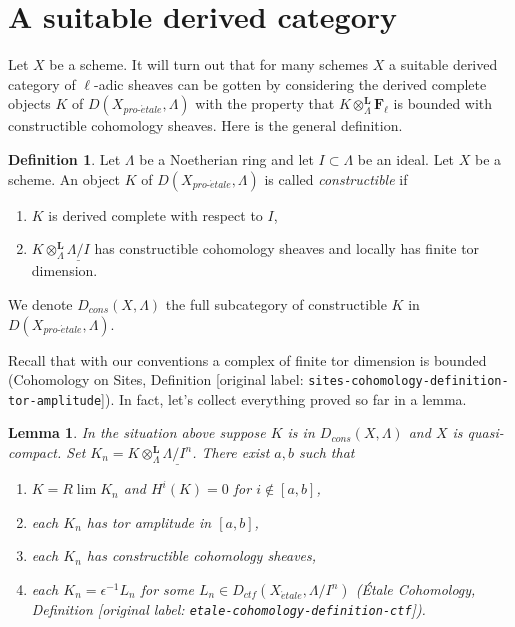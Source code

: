 \documentclass[10pt,a4paper]{article}
\theoremstyle{plain}
\newtheorem{lemma}[subsection]{Lemma}
\theoremstyle{definition}
\newtheorem{definition}[subsection]{Definition}
\theoremstyle{remark}
\numberwithin{equation}{subsection}
\def\lim{\mathop{\mathrm{lim}}\nolimits}
\def\proetale{{pro\text{-}\acute{e}tale}}
\def\etale{{\acute{e}tale}}
\begin{document}
\section{A suitable derived category}
\label{section-suitable-derived}

\noindent
Let $X$ be a scheme. It will turn out that for many schemes $X$ a suitable
derived category of $\ell$-adic sheaves can be gotten by considering the
derived complete objects $K$ of $D(X_\proetale, \Lambda)$ with the property
that $K \otimes_\Lambda^\mathbf{L} \mathbf{F}_\ell$ is bounded with
constructible cohomology sheaves. Here is the general definition.

\begin{definition}
\label{definition-Dbc}
Let $\Lambda$ be a Noetherian ring and let $I \subset \Lambda$ be an ideal.
Let $X$ be a scheme. An object $K$ of $D(X_\proetale, \Lambda)$ is called
{\it constructible} if
\begin{enumerate}
\item $K$ is derived complete with respect to $I$,
\item $K \otimes_\Lambda^\mathbf{L} \underline{\Lambda/I}$
has constructible cohomology sheaves and locally has finite tor dimension.
\end{enumerate}
We denote $D_{cons}(X, \Lambda)$ the full subcategory of constructible
$K$ in $D(X_\proetale, \Lambda)$.
\end{definition}

\noindent
Recall that with our conventions a complex of finite tor dimension
is bounded (Cohomology on Sites, Definition
\textnormal{[original label: \nolinkurl{sites-cohomology-definition-tor-amplitude}]}).
In fact, let's collect everything proved so far in a lemma.

\begin{lemma}
\label{lemma-describe-constructible-complexes}
In the situation above suppose $K$ is in $D_{cons}(X, \Lambda)$
and $X$ is quasi-compact. Set
$K_n = K \otimes_\Lambda^\mathbf{L} \underline{\Lambda/I^n}$.
There exist $a, b$ such that
\begin{enumerate}
\item $K = R\lim K_n$ and $H^i(K) = 0$ for $i \not \in [a, b]$,
\item each $K_n$ has tor amplitude in $[a, b]$,
\item each $K_n$ has constructible cohomology sheaves,
\item each $K_n = \epsilon^{-1}L_n$ for some
$L_n \in D_{ctf}(X_\etale, \Lambda/I^n)$
(\'Etale Cohomology, Definition \textnormal{[original label: \nolinkurl{etale-cohomology-definition-ctf}]}).
\end{enumerate}
\end{lemma}
\end{document}
